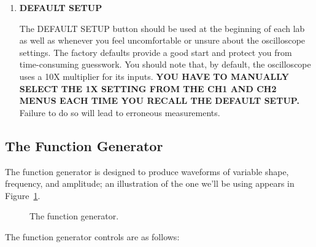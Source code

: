 \begin{enumerate}
\begin{enumerate}
\item {\bf Cursor 2:} Cursor 2 position. Time and voltage origins are the same as
for Cursor 1.

\end{enumerate}

\item {\bf DEFAULT SETUP}

The DEFAULT SETUP button should be used at the beginning of each lab as well as
whenever you feel uncomfortable or unsure about the oscilloscope settings. The
factory defaults provide a good start and protect you from time-consuming
guesswork. You should note that, by default, the oscilloscope uses a 10X
multiplier for its inputs. {\bf YOU HAVE TO MANUALLY SELECT THE 1X SETTING FROM
THE CH1 AND CH2 MENUS EACH TIME YOU RECALL THE DEFAULT SETUP.} Failure to do so
will lead to erroneous measurements.

\end{enumerate}

\subsection{The Function Generator}

The function generator is designed to produce waveforms of variable shape,
frequency, and amplitude; an illustration of the one we'll be using appears in
Figure~\ref{fig:scope:functiongen}.
\begin{figure}[htb]
\centerline{\epsfxsize=14cm }
\caption{The function generator.}
\label{fig:scope:functiongen}
\end{figure}
The function generator controls are as follows:

